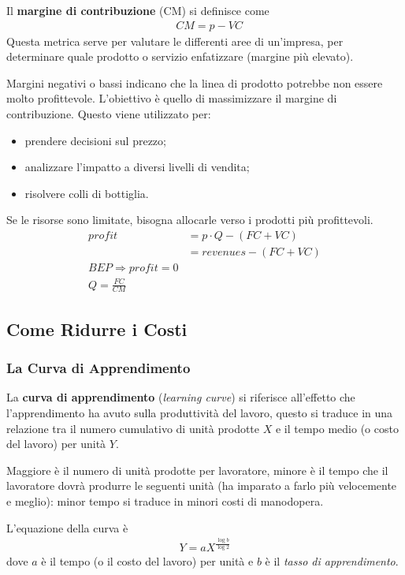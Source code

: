 \documentclass[a4paper,portrait,12pt]{article}
\theoremstyle{definition}
\begin{document}
Il \textbf{margine di contribuzione} (CM) si definisce come
\begin{align*}
&CM = p - VC
\end{align*}
Questa metrica serve per valutare le differenti aree di un'impresa, per determinare quale prodotto o servizio enfatizzare (margine più elevato).

Margini negativi o bassi indicano che la linea di prodotto potrebbe non essere molto profittevole.
L'obiettivo è quello di massimizzare il margine di contribuzione.
Questo viene utilizzato per:
\begin{itemize}
\item prendere decisioni sul prezzo;
\item analizzare l'impatto a diversi livelli di vendita;
\item risolvere colli di bottiglia.
\end{itemize}
Se le risorse sono limitate, bisogna allocarle verso i prodotti più profittevoli.
\begin{align*}
profit &= p \cdot Q - (FC + VC)\\
&= revenues - (FC + VC)\\
BEP \Rightarrow profit = 0\\
Q = \frac{FC}{CM}
\end{align*}

\subsection{Come Ridurre i Costi}

\subsubsection{La Curva di Apprendimento}
La \textbf{curva di apprendimento} (\emph{learning curve}) si riferisce all'effetto che l'apprendimento ha avuto sulla produttività del lavoro, questo si traduce in una relazione tra il numero cumulativo di unità prodotte $X$ e il tempo medio (o costo del lavoro) per unità $Y$.

Maggiore è il numero di unità prodotte per lavoratore, minore è il tempo che il lavoratore dovrà produrre le seguenti unità (ha imparato a farlo più velocemente e meglio): minor tempo si traduce in minori costi di manodopera.

L'equazione della curva è
\begin{align*}
Y = a X^{\frac{\log b}{\log 2}}
\end{align*}
dove $a$ è il tempo (o il costo del lavoro) per unità e $b$ è il \emph{tasso di apprendimento}.
\end{document}
